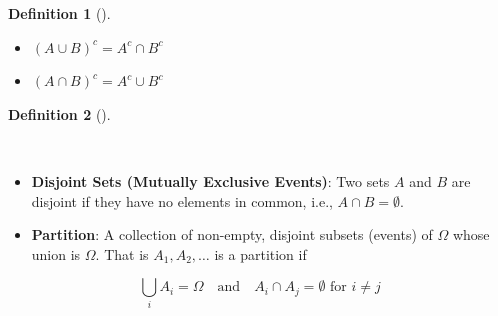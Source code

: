 \documentclass[
  letterpaper,
  DIV=11,
  numbers=noendperiod]{scrreport}
\providecommand{\tightlist}{%
  \setlength{\itemsep}{0pt}\setlength{\parskip}{0pt}}
\theoremstyle{definition}
\theoremstyle{plain}
\theoremstyle{plain}
\theoremstyle{definition}
\newtheorem{definition}{Definition}[chapter]
\theoremstyle{remark}
\begin{document}
\begin{tcolorbox}
\begin{definition}[]
\begin{itemize}
  \begin{itemize}
  \tightlist
  \item
    \((A \cup B)^c = A^c \cap B^c\)
  \item
    \((A \cap B)^c = A^c \cup B^c\)
  \end{itemize}
\end{itemize}

\end{definition}

\end{tcolorbox}

\begin{tcolorbox}[enhanced jigsaw, opacitybacktitle=0.6, bottomtitle=1mm, opacityback=0, toprule=.15mm, colbacktitle=quarto-callout-note-color!10!white, colback=white, left=2mm, title={Disjoint Sets and Partitions of Sample Space}, breakable, rightrule=.15mm, leftrule=.75mm, titlerule=0mm, colframe=quarto-callout-note-color-frame, arc=.35mm, coltitle=black, toptitle=1mm, bottomrule=.15mm]

\begin{definition}[]\protect\hypertarget{def-disjoint-partition}{}\label{def-disjoint-partition}

~

\begin{itemize}
\item
  \textbf{Disjoint Sets (Mutually Exclusive Events)}: Two sets \(A\) and
  \(B\) are disjoint if they have no elements in common, i.e.,
  \(A \cap B = \emptyset\).
\item
  \textbf{Partition}: A collection of non-empty, disjoint subsets
  (events) of \(\Omega\) whose union is \(\Omega\). That is
  \(A_1,A_2, \ldots\) is a partition if
\end{itemize}

\[
\bigcup_{i} A_i = \Omega \quad \text{and} \quad A_i \cap A_j = \emptyset \text{ for } i \ne j
\]

\end{definition}

\end{tcolorbox}
\end{document}
